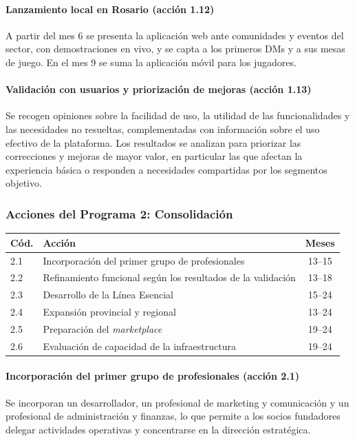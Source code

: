 \paragraph{Lanzamiento local en Rosario (acción 1.12)}
A partir del mes 6 se presenta la aplicación web ante comunidades y eventos del sector, con demostraciones en vivo, y se capta a los primeros DMs y a sus mesas de juego. En el mes 9 se suma la aplicación móvil para los jugadores.

\paragraph{Validación con usuarios y priorización de mejoras (acción 1.13)}
Se recogen opiniones sobre la facilidad de uso, la utilidad de las funcionalidades y las necesidades no resueltas, complementadas con información sobre el uso efectivo de la plataforma. Los resultados se analizan para priorizar las correcciones y mejoras de mayor valor, en particular las que afectan la experiencia básica o responden a necesidades compartidas por los segmentos objetivo.

\subsubsection{Acciones del Programa 2: Consolidación}

\begin{center}
\small
\begin{tabularx}{\textwidth}{|l|X|c|}
\hline
\textbf{Cód.} & \textbf{Acción} & \textbf{Meses}\\ \hline
2.1 & Incorporación del primer grupo de profesionales & 13--15\\ \hline
2.2 & Refinamiento funcional según los resultados de la validación & 13--18\\ \hline
2.3 & Desarrollo de la Línea Esencial & 15--24\\ \hline
2.4 & Expansión provincial y regional & 13--24\\ \hline
2.5 & Preparación del \textit{marketplace} & 19--24\\ \hline
2.6 & Evaluación de capacidad de la infraestructura & 19--24\\ \hline
\end{tabularx}
\end{center}

\paragraph{Incorporación del primer grupo de profesionales (acción 2.1)}
Se incorporan un desarrollador, un profesional de marketing y comunicación y un profesional de administración y finanzas, lo que permite a los socios fundadores delegar actividades operativas y concentrarse en la dirección estratégica.

